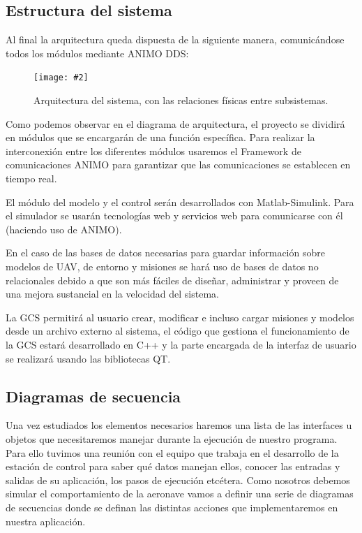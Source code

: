 \documentclass[12pt,a4paper,spanish]{book} %
\newcommand{\imgCentradaGrande}[3]{
\begin{figure}[H]
\begin{center}
\texttt{[image: \#2]}
\caption{#3}
\label{#1}
\end{center}
\end{figure}
}
\begin{document}
\subsection{Estructura del sistema}

Al final la arquitectura queda dispuesta de la siguiente manera, comunicándose todos los módulos mediante ANIMO DDS:

\imgCentradaGrande{fig.4.1}{img/arquitectura.eps}{Arquitectura del sistema, con las relaciones físicas entre subsistemas.}

Como podemos observar en el diagrama de arquitectura, el proyecto se dividirá en módulos que se encargarán de una función específica. Para realizar la interconexión entre los diferentes módulos usaremos el Framework de comunicaciones ANIMO para garantizar que las comunicaciones se establecen en tiempo real.

El módulo del modelo y el control serán desarrollados con Matlab-Simulink. Para el simulador se usarán tecnologías web y servicios web para comunicarse con él (haciendo uso de ANIMO).

En el caso de las bases de datos necesarias para guardar información sobre modelos de UAV, de entorno y misiones se hará uso de bases de datos no relacionales debido a que son más fáciles de diseñar, administrar y proveen de una mejora sustancial en la velocidad del sistema.

La GCS permitirá al usuario crear, modificar e incluso cargar misiones y modelos desde un archivo externo al sistema, el código que gestiona el funcionamiento de la GCS estará desarrollado en C++ y la parte encargada de la interfaz de usuario se realizará usando las bibliotecas QT.

\subsection{Diagramas de secuencia}

Una vez estudiados los elementos necesarios haremos una lista de las interfaces u objetos que necesitaremos manejar durante la ejecución de nuestro programa. Para ello tuvimos una reunión con el equipo que trabaja en el desarrollo de la estación de control para saber qué datos manejan ellos, conocer las entradas y salidas de su aplicación, los pasos de ejecución etcétera. Como nosotros debemos simular el comportamiento de la aeronave vamos a definir una serie de diagramas de secuencias donde se definan las distintas acciones que implementaremos en nuestra aplicación.
\end{document}
